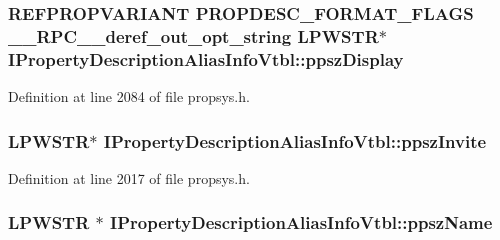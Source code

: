 \subsubsection[{\texorpdfstring{ppsz\+Display}{ppszDisplay}}]{ {\bf R\+E\+F\+P\+R\+O\+P\+V\+A\+R\+I\+A\+NT} {\bf P\+R\+O\+P\+D\+E\+S\+C\+\_\+\+F\+O\+R\+M\+A\+T\+\_\+\+F\+L\+A\+GS} {\bf \+\_\+\+\_\+\+R\+P\+C\+\_\+\+\_\+deref\+\_\+out\+\_\+opt\+\_\+string} {\bf L\+P\+W\+S\+TR}$\ast$ I\+Property\+Description\+Alias\+Info\+Vtbl\+::ppsz\+Display}\hypertarget{struct_i_property_description_alias_info_vtbl_a9992ed596e47d805a69c2c56f0c689a2}{}\label{struct_i_property_description_alias_info_vtbl_a9992ed596e47d805a69c2c56f0c689a2}


Definition at line 2084 of file propsys.\+h.

\subsubsection[{\texorpdfstring{ppsz\+Invite}{ppszInvite}}]{ {\bf L\+P\+W\+S\+TR}$\ast$ I\+Property\+Description\+Alias\+Info\+Vtbl\+::ppsz\+Invite}\hypertarget{struct_i_property_description_alias_info_vtbl_ad1425065ef2d26628f0c1720c1711a9e}{}\label{struct_i_property_description_alias_info_vtbl_ad1425065ef2d26628f0c1720c1711a9e}


Definition at line 2017 of file propsys.\+h.

\subsubsection[{\texorpdfstring{ppsz\+Name}{ppszName}}]{ {\bf L\+P\+W\+S\+TR} $\ast$ I\+Property\+Description\+Alias\+Info\+Vtbl\+::ppsz\+Name}\hypertarget{struct_i_property_description_alias_info_vtbl_a4ebd9b54f17e5e58cdab457e795dbfd0}{}\label{struct_i_property_description_alias_info_vtbl_a4ebd9b54f17e5e58cdab457e795dbfd0}


